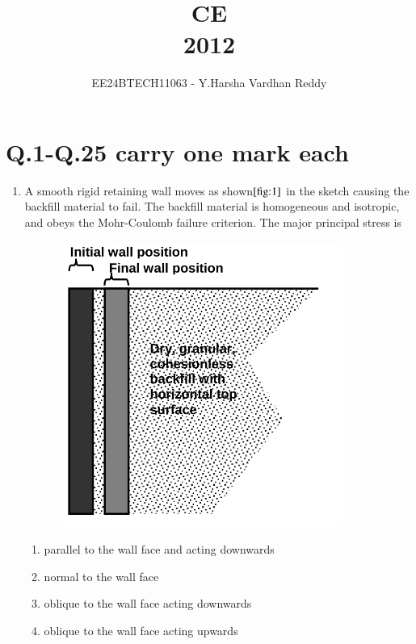 \documentclass[journal]{IEEEtran}
\renewcommand{\thefigure}{\theenumi}
\renewcommand{\thetable}{\theenumi}
\numberwithin{equation}{enumi}
\numberwithin{figure}{enumi}
\renewcommand{\thetable}{\theenumi}
\begin{document}

\vspace{3cm}

\title{CE\\2012}
\author{EE24BTECH11063 - Y.Harsha Vardhan Reddy}
\maketitle

\bigskip

\renewcommand{\thefigure}{\theenumi}
\renewcommand{\thetable}{\theenumi}

\section*{Q.1-Q.25 carry one mark each}
\begin{enumerate}

\item  A smooth rigid retaining wall moves as shown$\ref{fig:1}$ in the sketch causing the backfill material to fail. The backfill material is homogeneous and isotropic, and obeys the Mohr-Coulomb failure criterion. The major principal stress is
\begin{figure}[H]
    \centering
    \includegraphics[scale=0.5]{figs/1.png} %
    \caption{}
    \label{fig:1}
\end{figure}
\begin{enumerate}
    \item parallel to the wall face and acting downwards
    \item normal to the wall face
    \item oblique to the wall face acting downwards
    \item oblique to the wall face acting upwards
\end{enumerate}


\end{enumerate}
\end{document}
